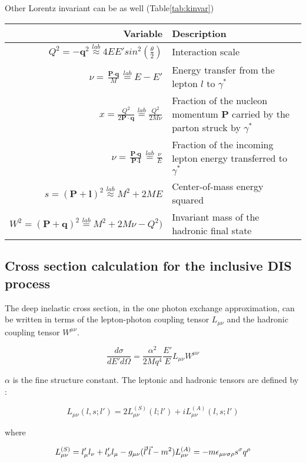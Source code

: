 Other Lorentz invariant can be as well (Table\ref{tab:kinvar})

\begin{tabular*}{\textwidth}{r|l}
  \hline
  \hline
  Variable & Description \\
  \hline
  \hline
  $Q^2 = -\textbf{q}^2 \stackrel{lab}{\approx} 4EE'sin^2(\frac{\theta}{2})$ & Interaction scale \\
  $\nu = \frac{\textbf{P}\cdot\textbf{q}}{M} \stackrel{lab}{=} E - E'$ & Energy transfer from the lepton $l$ to $\gamma^*$ \\
  $x = \frac{Q^2}{2\textbf{P}\cdot\textbf{q}} \stackrel{lab}{=} \frac{Q^2}{2M\nu}$ & Fraction of the nucleon momentum \textbf{P} carried by the parton struck by $\gamma^*$ \\
  $\nu = \frac{\textbf{P}\cdot\textbf{q}}{\textbf{P}\cdot\textbf{l}} \stackrel{lab}{=} \frac{\nu}{E}$ & Fraction of the incoming lepton energy transferred to $\gamma^*$ \\
  $s = (\textbf{P}+\textbf{l})^2 \stackrel{lab}{\approx} M^2 + 2ME$ & Center-of-mass energy squared \\
  $W^2 = (\textbf{P}+\textbf{q})^2 \stackrel{lab}{=} M^2 + 2M\nu - Q^2)$ & Invariant mass of the hadronic final state \\
  \hline
  \hline
\end{tabular*}

\subsection*{Cross section calculation for the inclusive DIS process}

The deep inelastic cross section, in the one photon exchange approximation, can be written in terms
of the lepton-photon coupling tensor $L_{\mu\nu}$ and the hadronic coupling tensor $W^{\mu\nu}$.

\begin{equation}
  \frac{d\sigma}{dE'd\Omega} = \frac{\alpha^2}{2Mq^4}\frac{E'}{E}L_{\mu\nu}W^{\mu\nu}
\end{equation}

$\alpha$ is the fine structure constant. The leptonic and hadronic tensors are defined by :

\begin{equation}
  L_{\mu\nu}(l,s;l') = 2{L^{(S)}_{\mu\nu}(l;l')+iL^{(A)}_{\mu\nu}(l,s;l')}
\end{equation}

where

\begin{equation}
  L^{(S)}_{\mu\nu} = l_{\mu}'l_{\nu} + l_{\nu}'l_{\mu} - g_{\mu\nu}(\vec{l}'\vec{l}-m^2) \\
  L^{(A)}_{\mu\nu} = -m\epsilon_{\mu\nu\sigma\rho}s^{\sigma}q^{\rho}
\end{equation}

